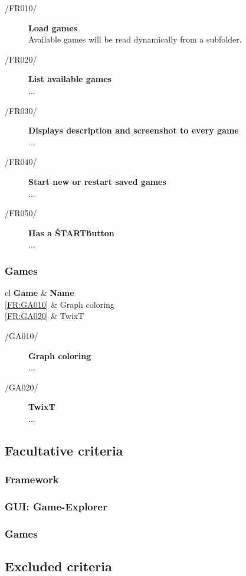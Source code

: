 \vspace{1cm}

\begin{description}
  	\item[/FR010/\label{FR:GE010}] {\bf Load games}  \hfill \\
  	Available games will be read dynamically from a subfolder.
 	\item[/FR020/\label{FR:GE020}] {\bf List available games}  \\
 	...
	\item[/FR030/\label{FR:GE030}] {\bf Displays description and screenshot to every game}  \\
  	...
	\item[/FR040/\label{FR:GE040}] {\bf Start new or restart saved games}  \\
	...
	\item[/FR050/\label{FR:GE050}] {\bf Has a \'START\' button}  \\
	...
\end{description}

\subsubsection{Games}
\begin{tabular}{{c}{l}}
    \hline
    {\bf Game} & {\bf Name} \\ \hline
	\ref{FR:GA010} & Graph coloring \\
	\ref{FR:GA020} & TwixT \\
\end{tabular}

\vspace{1cm}

\begin{description}
  	\item[/GA010/\label{FR:GA010}] {\bf Graph coloring}  \hfill \\
  	...
 	\item[/GA020/\label{FR:GA020}] {\bf TwixT}  \\
 	...
\end{description}


\subsection{Facultative criteria}
\subsubsection{Framework}
\subsubsection{GUI: Game-Explorer}
\subsubsection{Games}

\subsection{Excluded criteria}